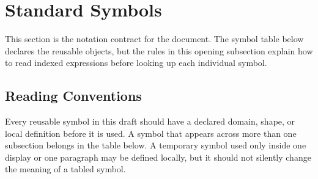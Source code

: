 \section{Standard Symbols}
\label{sec:standard-symbols}

This section is the notation contract for the document.  The symbol table below
declares the reusable objects, but the rules in this opening subsection explain
how to read indexed expressions before looking up each individual symbol.

\subsection{Reading Conventions}
\label{subsec:notation-reading-conventions}

Every reusable symbol in this draft should have a declared domain, shape, or
local definition before it is used.  A symbol that appears across more than one
subsection belongs in the table below.  A temporary symbol used only inside one
display or one paragraph may be defined locally, but it should not silently
change the meaning of a tabled symbol.

